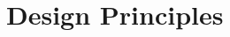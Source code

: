 \documentclass[comptress]{beamer}
\begin{document}
\section{Design Principles}
\label{sec:principles}













\end{document}
